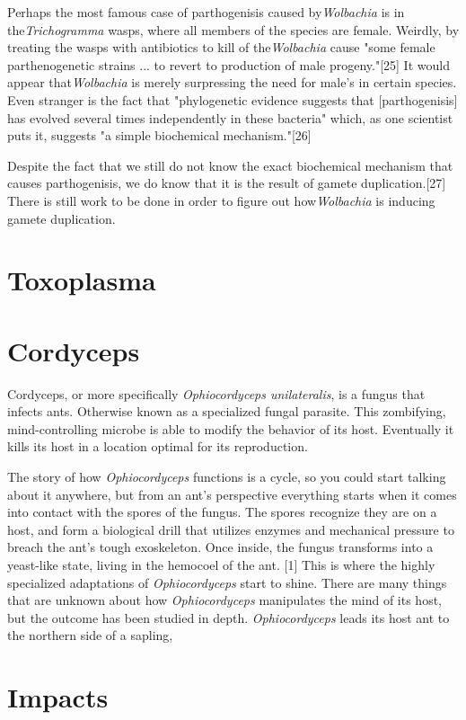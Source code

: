 \documentclass[twocolumn]{article}
\begin{document}
Perhaps the most famous case of parthogenisis caused by\textit{Wolbachia} is in the\textit{Trichogramma} wasps, where all members of the species are female. Weirdly, by treating the wasps with antibiotics to kill of the\textit{Wolbachia} cause "some female parthenogenetic strains ... to revert to production of male progeny."[25] It would appear that\textit{Wolbachia} is merely surpressing the need for male's in certain species. Even stranger is the fact that "phylogenetic evidence suggests that [parthogenisis] has evolved several times independently in these bacteria" which, as one scientist puts it, suggests "a simple biochemical mechanism."[26]  

Despite the fact that we still do not know the exact biochemical mechanism that causes parthogenisis, we do know that it is the result of gamete duplication.[27] There is still work to be done in order to figure out how\textit{Wolbachia} is inducing gamete duplication.

\section*{Toxoplasma}

\section*{Cordyceps}
Cordyceps, or more specifically \textit{Ophiocordyceps unilateralis}, is a fungus that infects ants. Otherwise known as a specialized fungal parasite. This zombifying, mind-controlling microbe is able to modify the behavior of its host. Eventually it kills its host in a location optimal for its reproduction. 

The story of how \textit{Ophiocordyceps} functions is a cycle, so you could start talking about it anywhere, but from an ant's perspective everything starts when it comes into contact with the spores of the fungus. The spores recognize they are on a host, and form a biological drill that utilizes enzymes and mechanical pressure to breach the ant's tough exoskeleton. Once inside, the fungus transforms into a yeast-like state, living in the hemocoel of the ant. [1] This is where the highly specialized adaptations of \textit{Ophiocordyceps} start to shine. There are many things that are unknown about how \textit{Ophiocordyceps} manipulates the mind of its host, but the outcome has been studied in depth. \textit{Ophiocordyceps} leads its host ant to the northern side of a sapling, 


\section*{Impacts}
\end{document}
